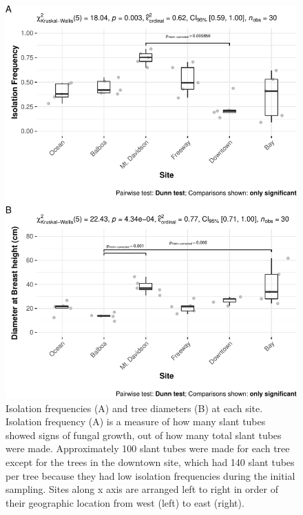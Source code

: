 \documentclass[fleqn,10pt,lineno]{wlpeerj} %
\begin{document}
\begin{figure}
\centering
\includegraphics{gibson2023_files/figure-latex/isolation-dbh-freq-plots-1.pdf}
\caption{\label{fig:isolation-dbh-freq-plots}Isolation frequencies (A) and tree diameters (B) at each site. Isolation frequency (A) is a measure of how many slant tubes showed signs of fungal growth, out of how many total slant tubes were made. Approximately 100 slant tubes were made for each tree except for the trees in the downtown site, which had 140 slant tubes per tree because they had low isolation frequencies during the initial sampling. Sites along x axis are arranged left to right in order of their geographic location from west (left) to east (right).}
\end{figure}
\end{document}

